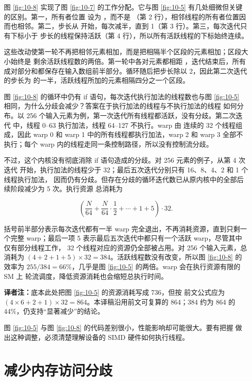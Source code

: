 图 \ref{fig:10-8} 实现了图 \ref{fig:10-7} 的工作分配。它与图 \ref{fig:10-5}
有几处细微但关键的区别。第一，所有者位置  设为 ，而不是
（第 2 行），相邻线程的所有者位置因而也相邻。第二，步长从
 开始，每次减半，直到 1（第 3 行）。第三，每次迭代只有下标小于
步长的线程保持活跃（第 4 行），所以所有活跃线程的下标始终连续。

这些改动使第一轮不再把相邻元素相加，而是把相隔半个区段的元素相加；区段大小始终是
剩余活跃线程数的两倍。第一轮中各对元素都相距 ，迭代结束后，所有
成对部分和都保存在输入数组前半部分。循环随后把步长除以 2，因此第二次迭代的步长为
 的一半，活跃线程所加的元素相隔四分之一个区段。

图 \ref{fig:10-8} 的循环中仍有 if 语句，每次迭代执行加法的线程数也与图
\ref{fig:10-5} 相同，为什么分歧会减少？答案在于执行加法的线程与不执行加法的线程
如何分布。以 256 个输入元素为例，第一次迭代所有线程都活跃，没有分歧。第二次迭代
中，线程 0--63 执行加法，线程 64--127 不执行。warp 由  连续的
32 个线程组成，因此 warp 0 和 warp 1 中的所有线程都执行加法，warp 2 和 warp 3
全部不执行；每个 warp 内的线程走同一条控制路径，所以没有控制流分歧。

不过，这个内核没有彻底消除 if 语句造成的分歧。对 256 元素的例子，从第 4 次迭代
开始，执行加法的线程少于 32；最后五次迭代分别只有 16、8、4、2 和 1 个线程执行加法，
因而仍有分歧。但存在分歧的循环迭代数已从原内核中的全部后续阶段减少为 5 次。执行资源
总消耗为

\[
  \left(\frac{N}{64}+\frac{N}{64}\cdot\frac12+\cdots+1+5\right)\cdot32.
\]

括号前半部分表示每次迭代都有一半 warp 完全退出，不再消耗资源，直到只剩一个完整
warp；最后一项 5 表示最后五次迭代中都只有一个活跃 warp，尽管其中仅有部分线程工作，
32 个线程对应的资源仍全部被占用。对 256 个输入元素，总消耗为
$(4+2+1+5)\times32=384$。活跃线程数没有改变，所以图 \ref{fig:10-8} 的效率为
$255/384=66\%$，几乎是图 \ref{fig:10-5} 的两倍。warp 会在执行资源有限的 SM 上
轮流调度，降低资源消耗也会缩短总执行时间。

\noindent\textbf{译者注：}底本此处把图 \ref{fig:10-5} 的资源消耗写成 736，但按
前文公式应为 $(4\times6+2+1)\times32=864$。本译稿沿用前文可复算的 864；384
约为 864 的 44\%，仍支持“显著减少”的结论。

图 \ref{fig:10-5} 与图 \ref{fig:10-8} 的代码差别很小，性能影响却可能很大。要有把握
做出这种调整，必须清楚理解设备的 SIMD 硬件如何执行线程。

\section{减少内存访问分歧}
\label{sec:reduction-memory-divergence}

